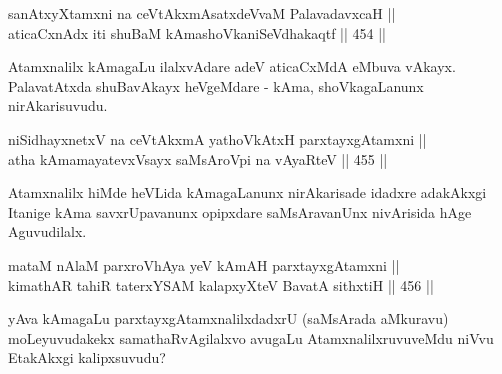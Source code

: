 \begin{shl}
\footnotemark[1]sanAtxyXtamxni na ceVtAkxmAsatxdeVvaM PalavadavxcaH || \\
aticaCxnAdx iti shuBaM kAmashoVkaniSeVdhakaqtf \hfill || 454 ||  
\end{shl}

\begin{artha}
Atamxnalilx kAmagaLu ilalxvAdare adeV aticaCxMdA eMbuva
vAkayx. PalavatAtxda shuBavAkayx heVgeMdare - kAma, shoVkagaLanunx
nirAkarisuvudu.
\end{artha}


\begin{shl}
niSidhayxnetxV na ceVtAkxmA yathoVkAtxH parxtayxgAtamxni || \\
atha kAmamayatevxV\s sayx saMsAroV\s pi na vAyaRteV \hfill || 455 ||  
\end{shl}

\begin{artha}
Atamxnalilx hiMde heVLida kAmagaLanunx nirAkarisade idadxre
adakAkxgi Itanige kAma savxrUpavanunx opipxdare saMsAravanUnx
nivArisida hAge Aguvudilalx.
\end{artha}


\begin{shl}
mataM nAlaM parxroVhAya yeV kAmAH parxtayxgAtamxni || \\
kimathAR tahiR taterxYSAM kalapxyXteV BavatA sithxtiH \hfill || 456 ||  
\end{shl}

\begin{artha}
yAva kAmagaLu parxtayxgAtamxnalilxdadxrU (saMsArada aMkuravu)
moLeyuvudakekx samathaRvAgilalxvo avugaLu AtamxnalilxruvuveMdu niVvu
EtakAkxgi kalipxsuvudu?
\end{artha}

